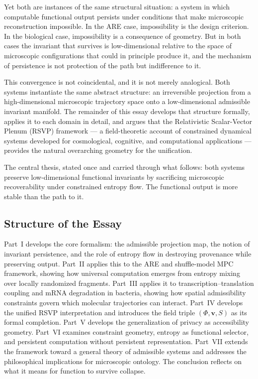\documentclass[12pt, a4paper]{article}
\theoremstyle{essaystyle}
\begin{document}
Yet both are instances of the same structural situation: a system in which computable
functional output persists under conditions that make microscopic reconstruction
impossible. In the ARE case, impossibility is the design criterion. In the biological
case, impossibility is a consequence of geometry. But in both cases the invariant that
survives is low-dimensional relative to the space of microscopic configurations that
could in principle produce it, and the mechanism of persistence is not protection of the
path but indifference to it.

This convergence is not coincidental, and it is not merely analogical. Both systems
instantiate the same abstract structure: an irreversible projection from a
high-dimensional microscopic trajectory space onto a low-dimensional admissible
invariant manifold. The remainder of this essay develops that structure formally,
applies it to each domain in detail, and argues that the Relativistic Scalar-Vector
Plenum (RSVP) framework --- a field-theoretic account of constrained dynamical systems
developed for cosmological, cognitive, and computational applications --- provides the
natural overarching geometry for the unification.

The central thesis, stated once and carried through what follows: both systems preserve
low-dimensional functional invariants by sacrificing microscopic recoverability under
constrained entropy flow. The functional output is more stable than the path to it.

\subsection*{Structure of the Essay}

Part~I develops the core formalism: the admissible projection map, the notion of
invariant persistence, and the role of entropy flow in destroying provenance while
preserving output. Part~II applies this to the ARE and shuffle-model MPC framework,
showing how universal computation emerges from entropy mixing over locally randomized
fragments. Part~III applies it to transcription--translation coupling and mRNA
degradation in bacteria, showing how spatial admissibility constraints govern which
molecular trajectories can interact. Part~IV develops the unified RSVP interpretation
and introduces the field triple $(\Phi, \mathbf{v}, S)$ as its formal completion.
Part~V develops the generalization of privacy as accessibility geometry. Part~VI
examines constraint geometry, entropy as functional selector, and persistent computation
without persistent representation. Part~VII extends the framework toward a general
theory of admissible systems and addresses the philosophical implications for microscopic
ontology. The conclusion reflects on what it means for function to survive collapse.
\end{document}
